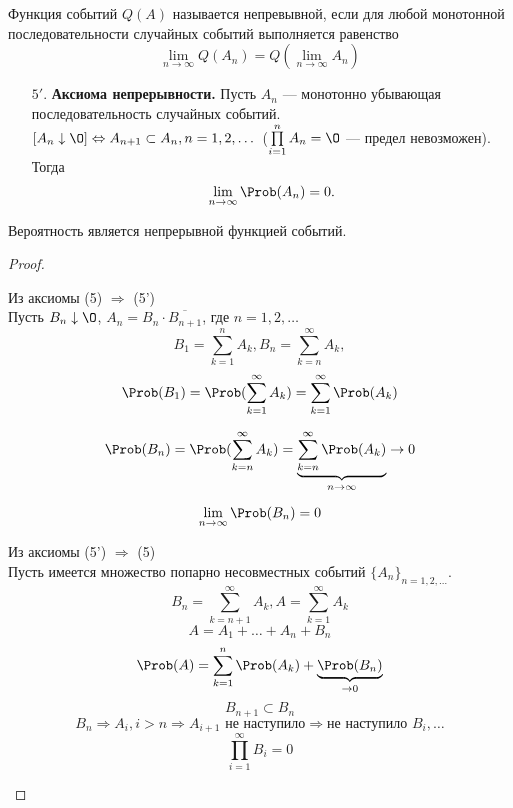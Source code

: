 \begin{definition}
  Функция событий $Q(A)$ называется непревывной, если для любой монотонной последовательности случайных событий выполняется равенство
  \[
    \lim\limits_{n \to \infty} Q(A_n) = Q(\lim\limits_{n \to \infty} A_n)
  \]
\end{definition}
\begin{enumerate}
  \setcounter{enumi}{4}
  \item[$5'.$] \textbf{Аксиома непрерывности.} Пусть $A_n$ --- монотонно убывающая последовательность случайных событий. \\ $[A_n \downarrow \O] \Leftrightarrow A_{n+1} \subset A_n, n = 1, 2, \dots$ ($\prod\limits_{i=1}^n A_n = \O$ --- предел невозможен). Тогда
  \[
    \lim\limits_{n \to \infty} \Prob(A_n) = 0.
  \]
\end{enumerate}

\begin{theorem}
  Вероятность является непрерывной функцией событий.
\end{theorem}
\begin{proof}
\begin{description}[leftmargin = 0cm]
  \item Из аксиомы (5) $\Rightarrow$ (5') \\
  Пусть $B_n \downarrow \O$, $A_n = B_n \cdot \overline{B_{n+1}}$, где $n = 1,2, \dots$ \\
  \[
    B_1 = \sum\limits_{k=1}^n A_k, B_n = \sum\limits_{k=n}^\infty A_k,
  \]
  \[
    \Prob(B_1) = \Prob(\sum\limits_{k=1}^\infty A_k) = \sum\limits_{k=1}^\infty \Prob(A_k)
  \]

  \[ \Prob(B_n) = \Prob(\sum\limits_{k=n}^\infty A_k) = \underbrace{\sum\limits_{k=n}^\infty \Prob(A_k)}_{n \to \infty} \to 0 \]

  \[ \lim\limits_{n \to \infty} \Prob (B_n) = 0\]
  \item Из аксиомы (5') $\Rightarrow$ (5) \\
  Пусть имеется множество попарно несовместных событий ${\{A_n\}}_{n = 1, 2, \dots}$.
  \[ B_n = \sum\limits_{k=n+1}^\infty A_k, A = \sum\limits_{k=1}^\infty A_k \]
  \[ A = A_1 + \ldots + A_n + B_n \]
  \[ \Prob(A) = \sum\limits_{k=1}^n \Prob(A_k) + \underbrace{\Prob(B_n)}_{\to 0} \]
  \[ B_{n+1} \subset B_n \]
  \[ B_n \Rightarrow A_i, i > n \Rightarrow A_{i+1} \text{ не наступило} \Rightarrow \text{не наступило } B_i, \dots \]
  \[ \prod\limits_{i=1}^\infty B_i = 0 \]
\end{description}
\end{proof}
